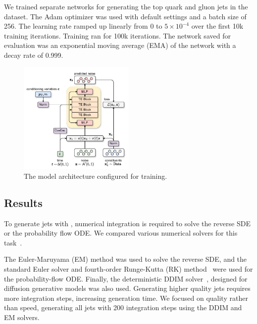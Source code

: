 We trained separate networks for generating the top quark and gluon jets in the dataset.
The Adam optimizer was used with default settings and a batch size of 256.
The learning rate ramped up linearly from 0 to $5 \times 10^{-4}$ over the first 10k training iterations.
Training ran for 100k iterations.
The network saved for evaluation was an exponential moving average (EMA) of the network with a decay rate of 0.999.

\begin{figure}
    \centering
    \includegraphics[width=0.5\textwidth]{Figures/jet_generation/pcjedi.pdf}
    \caption{The \pcjedi model architecture configured for training.}
    \label{fig:pcjedi}
\end{figure}

\subsection{Results}

To generate jets with \pcjedi, numerical integration is required to solve the reverse SDE or the probability flow ODE.
We compared various numerical solvers for this task~\cite{NumericalSolutionStochastic}.

The Euler-Maruyama (EM) method was used to solve the reverse SDE, and the standard Euler solver and fourth-order Runge-Kutta (RK) method~\cite{RungeKutta} were used for the probability-flow ODE.
Finally, the deterministic DDIM solver~\cite{DDIM}, designed for diffusion generative models was also used.
Generating higher quality jets requires more integration steps, increasing generation time.
We focused on quality rather than speed, generating all jets with 200 integration steps using the DDIM and EM solvers.



